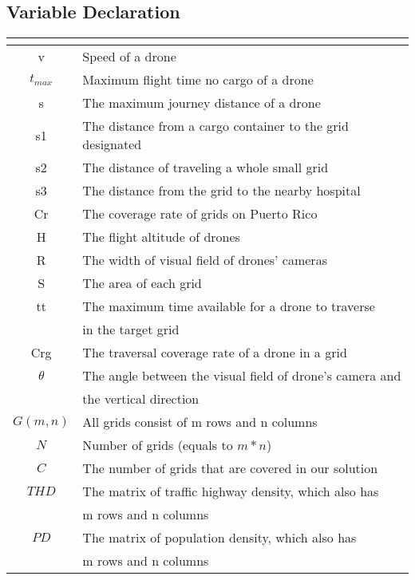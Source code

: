 \documentclass{mcmthesis}
\begin{document}
    \subsection{Variable Declaration} 
    \begin{center}
    	\begin{tabular}{c|l}
    	\toprule[2pt]
    \label{s}
    		\makebox[0.15\textwidth][c]{\textbf{Symbol}}	& \makebox[0.1\textwidth][c]{\textbf{\qquad\qquad\qquad\qquad\qquad\qquad\qquad Definition }}    \\ 	\midrule[1pt]
    		v & Speed of a drone \\ 
    		$t_{max}$ & Maximum flight time no cargo of a drone \\  
    		s  & The maximum journey distance of a drone  \\
    		s1 & The distance from a cargo container to the grid designated \\ 
    		s2 & The distance of traveling a whole small grid \\ 
    		s3 & The distance from the grid to the   nearby hospital \\ 
    		Cr & The coverage rate of grids on Puerto Rico \\ 
    		H  & The flight altitude of drones  \\  
    		R  & The width of visual field of drones' cameras \\
    		S  & The area of each grid \\
    		tt & The maximum time available for a drone to traverse\\
    		&  in the target grid \\
    		Crg & The traversal coverage rate of a drone in a grid \\
    	    $\theta$ & The angle between the visual field of drone's camera and \\
    	    & the vertical direction \\
    		$G(m,n)$ & All grids consist of m rows and n columns \\
    		$N$ & Number of grids (equals to $m*n$) \\
    		$C$  & The number of grids that are covered in our solution\\
    		$THD$ &   The matrix of traffic highway density, which also has \\
    		& m rows and n columns     \\
    		$PD$  &   The matrix of population density, which also has\\
    		&  m rows and n columns \\

\end{tabular}
\end{center}
\end{document}
